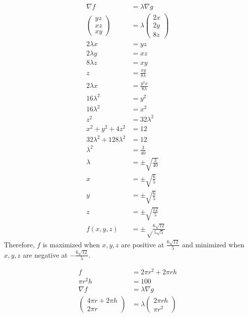 \documentclass[10pt]{extarticle}
\begin{document}
\begin{problem}{15.3}
\begin{description}[font=\normalfont]
      \item[12:]
        \begin{align*}
          \nabla f &= \lambda \nabla g\\
          \begin{pmatrix}yz\\xz\\xy\end{pmatrix} &= \lambda \begin{pmatrix}2x\\2y\\8z\end{pmatrix}\\
          2\lambda x &= yz\\
          2\lambda y &= xz\\
          8\lambda z &= xy\\
          z &= \frac{xy}{8\lambda}\\
          2\lambda x &= \frac{y^2x}{8\lambda}\\
          16\lambda^2 &= y^2 \tag*{$x\neq 0$}\\
          16\lambda^2 &= x^2 \tag*{$y \neq 0$}\\
          z^2 &= 32\lambda^2\\
          x^2 + y^2 + 4z^2 &= 12\\
          32\lambda^2 + 128\lambda^2 &= 12\\
          \lambda^2 &= \frac{3}{40}\\
          \lambda &= \pm \sqrt{\frac{3}{40}}\\
          x &= \pm \sqrt{\frac{6}{5}}\\
          y &= \pm \sqrt{\frac{6}{5}}\\
          z &= \pm \sqrt{\frac{12}{5}}\\
          f(x,y,z) &= \pm\sqrt\frac{6\sqrt{12}}{5\sqrt{5}}
        \end{align*}
        Therefore, $f$ is maximized when $x,y,z$ are positive at $\frac{6\sqrt{12}}{5}$ and minimized when $x,y,z$ are negative at $-\frac{6\sqrt{12}}{5}$.
      \item[36:]
        \begin{align*}
          f &= 2\pi r^2 + 2\pi r h\\
          \pi r^2 h &= 100\\
          \nabla f &= \lambda \nabla g\\
          \begin{pmatrix}4\pi r + 2\pi h\\2\pi r\end{pmatrix} &= \lambda \begin{pmatrix}2\pi r h \\ \pi r^2\end{pmatrix}\\

\end{align*}
\end{description}
\end{problem}
\end{document}
